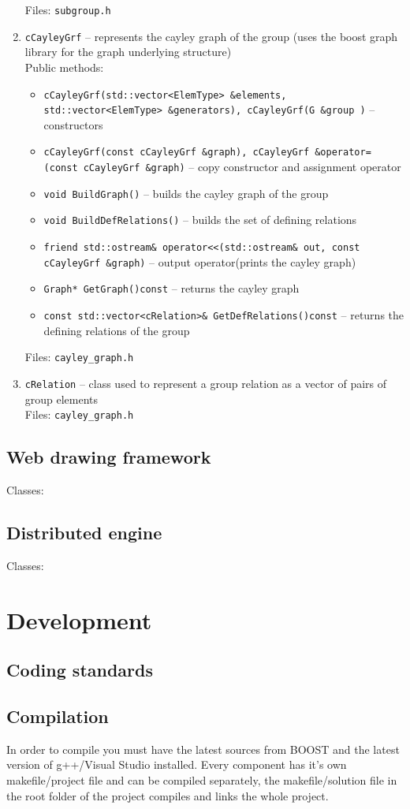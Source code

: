 \documentclass[a4paper,11pt]{article}
\begin{document}
\begin{enumerate}
Files: \verb=subgroup.h=
\item 
\verb=cCayleyGrf= -- represents the cayley graph of the group (uses the boost graph library for the graph underlying structure)\\
Public methods:
\begin{itemize}
\item
\verb=cCayleyGrf(std::vector<ElemType> &elements, std::vector<ElemType> &generators), cCayleyGrf(G &group )= -- constructors
\item
\verb+cCayleyGrf(const cCayleyGrf &graph), cCayleyGrf &operator=(const cCayleyGrf &graph)+ -- copy constructor and assignment operator
\item
\verb=void BuildGraph()= -- builds the cayley graph of the group
\item
\verb=void BuildDefRelations()= -- builds the set of defining relations
\item
\verb=friend std::ostream& operator<<(std::ostream& out, const cCayleyGrf &graph)= -- output operator(prints the cayley graph)
\item
\verb=Graph* GetGraph()const= -- returns the cayley graph
\item
\verb=const std::vector<cRelation>& GetDefRelations()const= -- returns the defining relations of the group
\end{itemize}
Files: \verb=cayley_graph.h=
\item
\verb=cRelation= -- class used to represent a group relation as a vector of pairs of group elements\\
Files: \verb=cayley_graph.h=
\end{enumerate}
\subsection{Web drawing framework}
Classes:


\subsection{Distributed engine}
Classes:


\section{Development}
\subsection{Coding standards}
\subsection{Compilation}
In order to compile you must have the latest sources from BOOST and the latest version of g++/Visual Studio installed. Every component has it's own makefile/project file and can be compiled separately, the makefile/solution file in the root folder of the project compiles and links the whole project.
\end{document}
